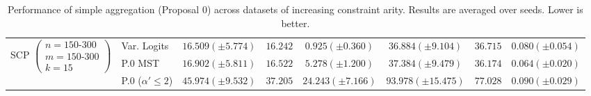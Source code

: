 \begin{table}[H]
{\begin{tabular}{llcccccc}
\midrule
\multirow{3}{*}{SCP $\left(\begin{array}{l}n=150\text{-}300\\ m=150\text{-}300\\ k=15\end{array}\right)$}
& Var. Logits
& $16.509 (\pm 5.774)$
& $16.242$
& $0.925 (\pm 0.360)$
& $36.884 (\pm 9.104)$
& $36.715$
& $0.080 (\pm 0.054)$ \\
\cmidrule(lr){2-8}

& P.0 MST
& $16.902 (\pm 5.811)$
& $16.522$
& $5.278 (\pm 1.200)$
& $37.384 (\pm 9.479)$
& $36.174$
& $0.064 (\pm 0.020)$ \\

& P.0 ($\alpha' \leq 2$)
& $45.974 (\pm 9.532)$
& $37.205$
& $24.243 (\pm 7.166)$
& $93.978 (\pm 15.475)$
& $77.028$
& $0.090 (\pm 0.029)$ \\

\bottomrule
\end{tabular}}
\caption{
Performance of simple aggregation (Proposal 0) across datasets of increasing constraint arity. 
Results are averaged over seeds. Lower is better.
}
\label{tab:chapter_5_proposal0_summary}
\end{table}